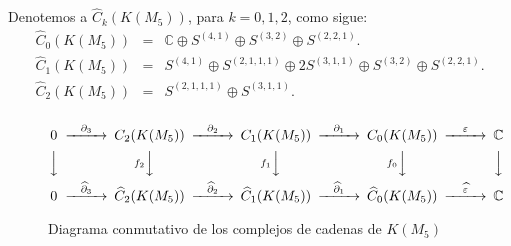 \documentclass[12pt]{book}
\theoremstyle{definition}
\newcounter{in}
\begin{document}
Denotemos a $\widehat C_{k}(K(M_{5}))$, para $k=0,1,2$, como sigue:
\begin{eqnarray*}
  \widehat C_{0}(K(M_{5}))&=&\mathbb{C}\oplus S^{(4,1)}\oplus
  S^{(3,2)}\oplus S^{(2,2,1)}.\\
  \widehat C_{1}(K(M_{5}))&=&S^{(4,1)}\oplus S^{(2,1,1,1)}\oplus 2S^{(3,1,1)}\oplus S^{(3,2)} \oplus S^{(2,2,1)}.\\
  \widehat C_{2}(K(M_{5}))&=&S^{(2,1,1,1)}\oplus S^{(3,1,1)}.\\
\end{eqnarray*}
\begin{figure}[h]
  \centering
    \[
  \begin{CD}
    0 @>{\partial_{3}}>> C_{2}(K(M_{5})) @>{\partial_{2}}>> C_{1}(K(M_{5})) @>{\partial_{1}}>> C_{0}(K(M_{5})) @>{\varepsilon}>> \mathbb{C}\\
    @VVV   @Vf_{2}VV   @Vf_{1}VV  @Vf_{0}VV  @VVV    \\
    0 @>{\widehat\partial_{3}}>> \widehat C_{2}(K(M_{5}))
    @>{\widehat\partial_{2}}>> \widehat C_{1}(K(M_{5}))
    @>{\widehat\partial_{1}}>> \widehat C_{0}(K(M_{5})) 
    @>{\widehat \varepsilon}>> \mathbb{C}
  \end{CD}
  \]
  
  \caption{Diagrama conmutativo de los complejos de cadenas de $K(M_{5})$}
  \label{fig:diagrama-conmutativo-clanes5}
\end{figure}

  
\end{document}
